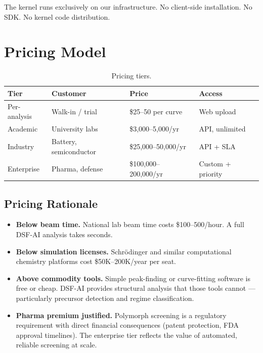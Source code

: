 \documentclass[11pt,letterpaper]{article}
\begin{document}
The kernel runs exclusively on our infrastructure. No client-side
installation. No SDK. No kernel code distribution.

\section{Pricing Model}

\begin{table}[h]
\centering
\begin{tabular}{@{}llll@{}}
\toprule
\textbf{Tier} & \textbf{Customer} & \textbf{Price} & \textbf{Access} \\
\midrule
Per-analysis & Walk-in / trial & \$25--50 per curve & Web upload \\
Academic & University labs & \$3,000--5,000/yr & API, unlimited \\
Industry & Battery, semiconductor & \$25,000--50,000/yr & API + SLA \\
Enterprise & Pharma, defense & \$100,000--200,000/yr & Custom + priority \\
\bottomrule
\end{tabular}
\caption{Pricing tiers.}
\end{table}

\subsection{Pricing Rationale}

\begin{itemize}
  \item \textbf{Below beam time.} National lab beam time costs
    \$100--500/hour. A full DSF-AI analysis takes seconds.
  \item \textbf{Below simulation licenses.} Schr\"{o}dinger and similar
    computational chemistry platforms cost \$50K--200K/year per seat.
  \item \textbf{Above commodity tools.} Simple peak-finding or
    curve-fitting software is free or cheap. DSF-AI provides structural
    analysis that those tools cannot --- particularly precursor detection
    and regime classification.
  \item \textbf{Pharma premium justified.} Polymorph screening is a
    regulatory requirement with direct financial consequences (patent
    protection, FDA approval timelines). The enterprise tier reflects
    the value of automated, reliable screening at scale.
\end{itemize}
\end{document}
